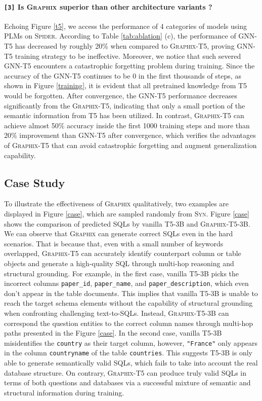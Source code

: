 \documentclass[letterpaper]{article} \usepackage{aaai23}  \usepackage{times}  \usepackage{helvet}  \usepackage{courier}  \usepackage[hyphens]{url}  \usepackage{graphicx} \usepackage{amsmath}
\newcommand{\graphix}{\textsc{Graphix}\xspace}
\newcommand{\spider}{\textsc{Spider}\xspace}
\begin{document}
\paragraph{\texttt{[3]} Is \graphix superior than other architecture variants ?} 
Echoing Figure \ref{t5}, we access the performance of 4 categories of models using PLMs on \spider. 
According to Table \ref{tab:ablation} (c), the performance of GNN-T5 has decreased by roughly 20\% when compared to \graphix-T5, proving GNN-T5 training strategy to be ineffective. 
Moreover, we notice that such severed GNN-T5 encounters a catastrophic forgetting problem \citep{catastrophic} during training. 
Since the accuracy of the GNN-T5 continues to be 0 in the first thousands of steps, as shown in Figure \ref{training}, it is evident that all pretrained knowledge from T5 would be forgotten. 
After convergence, the GNN-T5 performance decreases significantly from the \graphix-T5, indicating that only a small portion of the semantic information from T5 has been utilized. 
In contrast, \graphix-T5 can achieve almost 50\% accuracy inside the first 1000 training steps and more than 20\% improvement than GNN-T5 after convergence, which verifies the advantages of \graphix-T5 that can avoid catastrophic forgetting and augment generalization capability.



\subsection{Case Study}
To illustrate the effectiveness of \graphix qualitatively, two examples are displayed in Figure \ref{case}, which are sampled randomly from \textsc{Syn}. Figure \ref{case} shows the comparison of predicted SQLs by vanilla T5-3B and \graphix-T5-3B. We can observe that \graphix can generate correct SQLs even in the hard scenarios. That is because that, even with a small number of keywords overlapped, \graphix-T5 can accurately identify counterpart column or table objects and generate a high-quality SQL through multi-hop reasoning and structural grounding. For example, in the first case, vanilla T5-3B picks the incorrect columns \texttt{paper\_id}, \texttt{paper\_name}, and \texttt{paper\_description}, which even don't appear in the table documents. This implies that vanilla T5-3B is unable to reach the target schema elements without the capability of structural grounding when confronting challenging text-to-SQLs. Instead, \graphix-T5-3B can correspond the question entities to the correct column names through multi-hop paths presented in the Figure \ref{case}. In the second case, vanilla T5-3B misidentifies the \texttt{country} as their target column, however, \texttt{"France"} only appears in the column \texttt{countryname} of the table \texttt{countries}. This suggests T5-3B is only able to generate semantically valid SQLs, which fails to take into account the real database structure. On contrary, \graphix-T5 can produce truly valid SQLs in terms of both questions and databases via a successful mixture of semantic and structural information during training.
\end{document}
